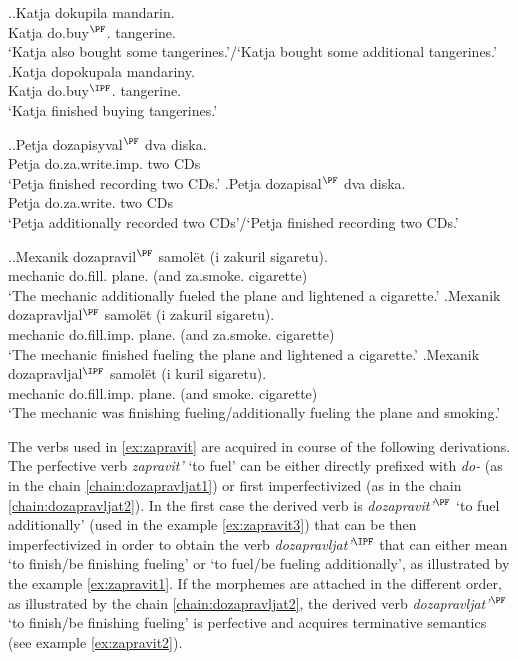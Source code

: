 \ex.\ag.\label{ex:do:kupit}Katja dokupila mandarin.\\
Katja do.buy$^{\PF}$. tangerine.\\
\trans `Katja also bought some tangerines.'/`Katja bought some additional tangerines.'
\bg.\label{ex:do:pokupat}Katja dopokupala mandariny.\\
Katja do.buy$^{\IPF}$. tangerine.\\
\trans `Katja finished buying tangerines.'

\ex.\ag.\label{ex:do:zapisyvat}Petja dozapisyval$^{\PF}$ dva diska.\\
Petja do.za.write.imp. two CDs\\
\trans `Petja finished recording two CDs.'
\bg.\label{ex:do:zapisat}Petja dozapisal$^{\PF}$ dva diska.\\
Petja do.za.write. two CDs\\
\trans `Petja additionally recorded two CDs'/`Petja finished recording two CDs.'

\ex.\label{ex:zapravit}\ag.\label{ex:zapravit3}Mexanik dozapravil$^{\PF}$ samol\"et (i zakuril sigaretu).\\
mechanic do.fill. plane. (and za.smoke. cigarette)\\
\trans `The mechanic additionally fueled the plane and lightened a cigarette.'
\bg.\label{ex:zapravit2}Mexanik dozapravljal$^{\PF}$ samol\"et (i zakuril sigaretu).\\
mechanic do.fill.imp. plane. (and za.smoke. cigarette)\\
\trans `The mechanic finished fueling the plane and lightened a cigarette.'
\bg.\label{ex:zapravit1}Mexanik dozapravljal$^{\IPF}$ samol\"et (i kuril sigaretu).\\
mechanic do.fill.imp. plane. (and smoke. cigarette)\\
\trans `The mechanic was finishing fueling/additionally fueling the plane and smoking.'

The verbs used in \ref{ex:zapravit} are acquired in course of the following derivations. The perfective verb \textit{zapravit'} `to fuel' can be either directly prefixed with \textit{do-} (as in the chain \ref{chain:dozapravljat1}) or first imperfectivized (as in the chain \ref{chain:dozapravljat2}). In the first case the derived verb is \textit{dozapravit'}$^{\PF}$ `to fuel additionally' (used in the example \ref{ex:zapravit3}) that can be then imperfectivized in order to obtain the verb \textit{dozapravljat'}$^{\IPF}$ that can either mean `to finish/be finishing fueling' or `to fuel/be fueling additionally', as illustrated by the example \ref{ex:zapravit1}. If the morphemes are attached in the different order, as illustrated by the chain \ref{chain:dozapravljat2}, the derived verb \textit{dozapravljat'}$^{\PF}$ `to finish/be finishing fueling' is perfective and acquires terminative semantics (see example \ref{ex:zapravit2}).

